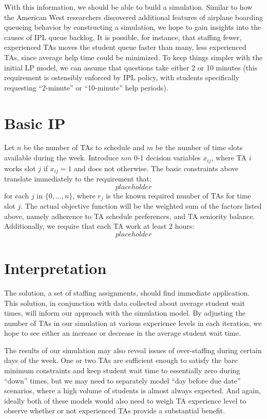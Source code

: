 \documentclass{article}
\begin{document}
\begin{multicols}{2}
With this information, we should be able to build a simulation. Similar to how the American West researchers discovered additional features of airplane boarding queueing behavior by constructing a simulation, we hope to gain insights into the causes of IPL queue backlog. It is possible, for instance, that staffing fewer, experienced TAs moves the student queue faster than many, less experienced TAs, since average help time could be minimized. To keep things simpler with the initial LP model, we can assume that questions take either 2 or 10 minutes (this requirement is ostensibly enforced by IPL policy, with students specifically requesting ``2-minute'' or ``10-minute'' help periods).

\section*{Basic IP}
Let $n$ be the number of TAs to schedule and $m$ be the number of time slots available during the week. Introduce $nm$ 0-1 decision variables $x_{ij}$, where TA $i$ works slot $j$ if $x_{ij} = 1$ and does not otherwise. The basic constraints above translate immediately to the requirement that:
\begin{equation}
placeholder
\end{equation}
for each $j$ in $\{0, ..., n\}$, where $r_j$ is the known required number of TAs for time slot $j$. The actual objective function will be the weighted sum of the factors listed above, namely adherence to TA schedule preferences, and TA seniority balance. Additionally, we require that each TA work at least 2 hours:
\begin{equation}
placeholder
\end{equation}

\section*{Interpretation}
The solution, a set of staffing assignments, should find immediate application. This solution, in conjunction with data collected about average student wait times, will inform our approach with the simulation model. By adjusting the number of TAs in our simulation at various experience levels in each iteration, we hope to see either an increase or decrease in the average student wait time.

The results of our simulation may also reveal issues of over-staffing during certain days of the week. One or two TAs are sufficient enough to satisfy the bare minimum constraints and keep student wait time to essentially zero during “down” times, but we may need to separately model “day before due date” scenarios, where a high volume of students is almost always expected. And again, ideally both of these models would also need to weigh TA experience level to observe whether or not experienced TAs provide a substantial benefit.


\end{multicols}
\end{document}
